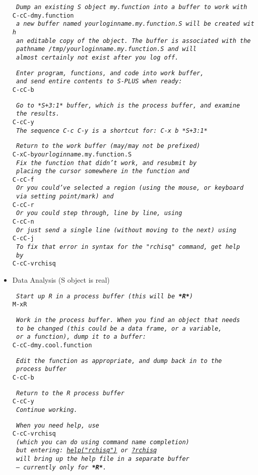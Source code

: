 \documentclass{article}
\newcommand*{\Splus}{\textsc{S-PLUS}}
\newcommand*{\Scmt}[1]{\hbox{\qquad {\footnotesize \#\#} \textsl{#1}}}
\newenvironment{Salltt}{\small\begin{alltt}}{\end{alltt}}
\begin{document}
\begin{itemize}
\begin{Salltt}
  \Scmt{Dump an existing S object my.function into a buffer to work with}
  C-c C-d my.function
  \Scmt{a new buffer named \textit{yourloginname}.my.function.S will be created with}
  \Scmt{an editable copy of the object.  The buffer is associated with the}
  \Scmt{pathname {\footnotesize /tmp/\textit{yourloginname}.my.function.S} and will}
  \Scmt{almost certainly not exist after you log off.}

  \Scmt{Enter program, functions, and code into work buffer,}
  \Scmt{and send entire contents to \Splus\ when ready:}
  C-c C-b

  \Scmt{Go to *S+3:1* buffer, which is the process buffer, and examine}
  \Scmt{the results.}
  C-c C-y
  \Scmt{The sequence C-c C-y is a shortcut for:  C-x b *S+3:1*}

  \Scmt{Return to the work buffer (may/may not be prefixed)}
  C-x C-b \textit{yourloginname}.my.function.S
  \Scmt{Fix the function that didn't work, and resubmit by}
  \Scmt{placing the cursor somewhere in the function and}
  C-c C-f
  \Scmt{Or you could've selected a region (using the mouse, or keyboard}
  \Scmt{via setting point/mark) and}
  C-c C-r
  \Scmt{Or you could step through, line by line, using}
  C-c C-n
  \Scmt{Or just send a single line (without moving to the next) using}
  C-c C-j
  \Scmt{To fix that error in syntax for the "rchisq" command, get help}
  \Scmt{by}
  C-c C-v rchisq
\end{Salltt}
\item Data Analysis (S object is real)
\begin{Salltt}
  \Scmt{Start up R in a process buffer (this will be \textbf{*R*})} 
  M-x R

  \Scmt{Work in the process buffer.  When you find an object that needs}
  \Scmt{to be changed (this could be a data frame, or a variable,}
  \Scmt{or a function), dump it to a buffer:}
  C-c C-d my.cool.function

  \Scmt{Edit the function as appropriate, and dump back in to the}
  \Scmt{process buffer}
  C-c C-b

  \Scmt{Return to the R process buffer}
  C-c C-y
  \Scmt{Continue working.}

  \Scmt{When you need help, use}
  C-c C-v rchisq
  \Scmt{(which you can do using command name completion)}
  \Scmt{but entering:   \underline{help("rchisq")} or  \underline{?rchisq}}
  \Scmt{will bring up the help file in a separate buffer}
  \Scmt{\emph{--- currently only for \textbf{*R*}}.}
\end{Salltt}
\end{itemize}
\end{document}
